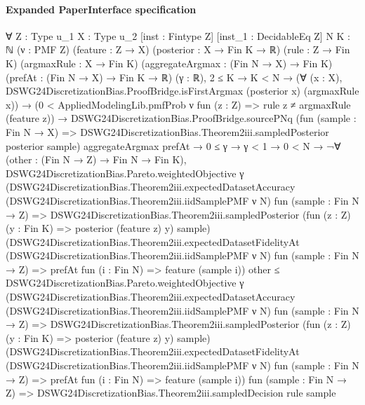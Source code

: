 \documentclass[10pt]{article}
\begin{document}
\paragraph{Expanded PaperInterface specification}
\begin{ReviewVerbatim}
∀ {Z : Type u_1} {X : Type u_2} [inst : Fintype Z] [inst_1 : DecidableEq Z] {N K : ℕ} (ν : PMF Z) (feature : Z → X)
  (posterior : X → Fin K → ℝ) (rule : Z → Fin K) (argmaxRule : X → Fin K) (aggregateArgmax : (Fin N → X) → Fin K)
  (prefAt : (Fin N → X) → Fin K → ℝ) (γ : ℝ),
  2 ≤ K →
    K < N →
      (∀ (x : X), DSWG24DiscretizationBias.ProofBridge.isFirstArgmax (posterior x) (argmaxRule x)) →
        (0 < AppliedModelingLib.pmfProb ν fun (z : Z) => rule z ≠ argmaxRule (feature z)) →
          DSWG24DiscretizationBias.ProofBridge.sourcePNq
              (fun (sample : Fin N → X) => DSWG24DiscretizationBias.Theorem2iii.sampledPosterior posterior sample)
              aggregateArgmax prefAt →
            0 ≤ γ →
              γ < 1 →
                0 < N →
                  ¬∀ (other : (Fin N → Z) → Fin N → Fin K),
                      DSWG24DiscretizationBias.Pareto.weightedObjective γ
                          (DSWG24DiscretizationBias.Theorem2iii.expectedDatasetAccuracy
                            (DSWG24DiscretizationBias.Theorem2iii.iidSamplePMF ν N) fun (sample : Fin N → Z) =>
                            DSWG24DiscretizationBias.Theorem2iii.sampledPosterior
                              (fun (z : Z) (y : Fin K) => posterior (feature z) y) sample)
                          (DSWG24DiscretizationBias.Theorem2iii.expectedDatasetFidelityAt
                            (DSWG24DiscretizationBias.Theorem2iii.iidSamplePMF ν N) fun (sample : Fin N → Z) =>
                            prefAt fun (i : Fin N) => feature (sample i))
                          other ≤
                        DSWG24DiscretizationBias.Pareto.weightedObjective γ
                          (DSWG24DiscretizationBias.Theorem2iii.expectedDatasetAccuracy
                            (DSWG24DiscretizationBias.Theorem2iii.iidSamplePMF ν N) fun (sample : Fin N → Z) =>
                            DSWG24DiscretizationBias.Theorem2iii.sampledPosterior
                              (fun (z : Z) (y : Fin K) => posterior (feature z) y) sample)
                          (DSWG24DiscretizationBias.Theorem2iii.expectedDatasetFidelityAt
                            (DSWG24DiscretizationBias.Theorem2iii.iidSamplePMF ν N) fun (sample : Fin N → Z) =>
                            prefAt fun (i : Fin N) => feature (sample i))
                          fun (sample : Fin N → Z) => DSWG24DiscretizationBias.Theorem2iii.sampledDecision rule sample
\end{ReviewVerbatim}
\end{document}
